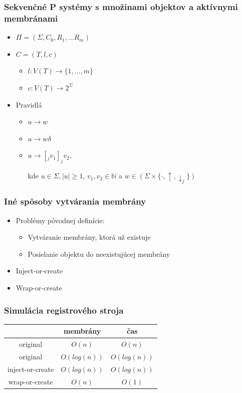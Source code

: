 \begin{frame}[t]\frametitle{Sekvenčné P systémy s množinami objektov a aktívnymi membránami}
  \begin{itemize}
    \item $\Pi = (\Sigma, C_0, R_1, \ldots R_m)$
    \pause
    \item $C = (T, l, c)$
    \begin{itemize}
      \item $l: V(T) \rightarrow \{1, \ldots, m\}$
      \item $c: V(T) \rightarrow 2^\Sigma$
    \end{itemize}
    \pause
    \item Pravidlá
    \begin{itemize}
      \item $u\rightarrow w$
      \item $u\rightarrow w\delta$
      \item $u\rightarrow [_j v_1]_j v_2$,

      kde $u \in \Sigma, |u|\geq 1$, $v_1,v_2\in \mathbb{N}$ a $w\in (\Sigma\times\{\cdot, \uparrow, \downarrow_{j}\})$
    \end{itemize}

  \end{itemize}
\end{frame}
\note{}

\begin{frame}[t]\frametitle{Iné spôsoby vytvárania membrány}
  \begin{itemize}
    \item Problémy pôvodnej definície:
    \begin{itemize}
      \item Vytváranie membrány, ktorá už existuje
      \item Posielanie objektu do neexistujúcej membrány
    \end{itemize}
    \pause
    \item Inject-or-create
    \pause
    \item Wrap-or-create
  \end{itemize}
\end{frame}

\begin{frame}[t]\frametitle{Simulácia registrového stroja}
  \begin{center}
    \begin{tabular}{c|c|c}
      \hline
      & membrány & čas \\ \hline
      original & $O(n)$ & $O(n)$ \\ \hline
      \pause
      original & $O(log(n))$ & $O(log(n))$ \\ \hline
      \pause
      inject-or-create & $O(log(n))$ & $O(log(n))$ \\ \hline
      \pause
      wrap-or-create & $O(n)$ & $O(1)$ \\ \hline
    \end{tabular}
  \end{center}
\end{frame}

